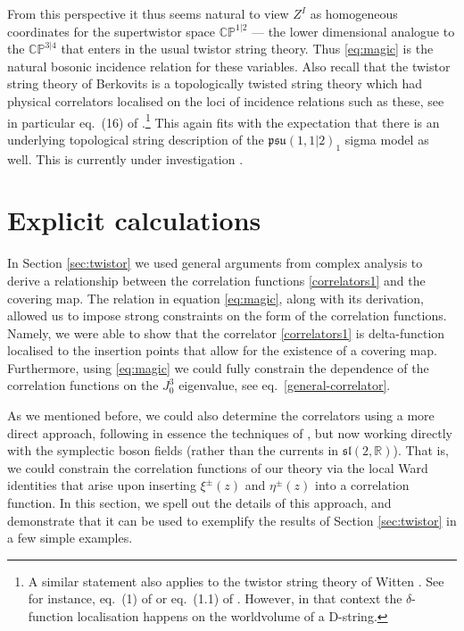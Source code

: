 \documentclass[a4paper,11pt]{article}
\numberwithin{equation}{section}
\begin{document}
{}From this perspective it thus seems natural to view $Z^I$ as homogeneous coordinates for the supertwistor space 
$\mathbb{CP}^{1|2}$ --- the lower dimensional analogue to the $\mathbb{CP}^{3|4}$ that enters in the usual twistor string theory. Thus \eqref{eq:magic} is the natural bosonic incidence relation for these variables. Also recall that the twistor string theory of Berkovits \cite{Berkovits:2004hg} is a topologically twisted string theory which had physical correlators localised on the loci of incidence relations such as these, see in particular eq.~(16) of \cite{Berkovits:2004hg}.\footnote{A similar statement also applies to the twistor string theory of Witten \cite{Witten:2003nn}. See for instance, eq.~(1) of \cite{Berkovits:2004hg} or eq.~(1.1) of \cite{Roiban:2004yf}. However, in that context the $\delta$-function localisation happens on the worldvolume of a D-string.} This again fits with the expectation that there is an underlying topological string description of the $\mathfrak{psu}(1,1|2)_1$ sigma model as well. This is currently under investigation \cite{GG}.







\section{Explicit calculations}\label{sec:examples}

In Section \ref{sec:twistor} we used general arguments from complex analysis to derive a relationship between the correlation functions \eqref{correlators1} and the covering map. The relation in equation \eqref{eq:magic}, along with its derivation, allowed us to impose strong constraints on the form of the correlation functions. Namely, we were able to show that the correlator \eqref{correlators1} is delta-function localised to the insertion points that allow for the existence of a covering map. Furthermore, using \eqref{eq:magic} we could fully constrain the dependence of the correlation functions on the $J^3_0$ eigenvalue, see eq.~\eqref{general-correlator}.

As we mentioned before, we could also determine the correlators using a more direct approach, following in essence the techniques of \cite{Eberhardt:2019ywk}, but now working directly with the symplectic boson fields (rather than the currents in $\mathfrak{sl}(2,\mathds{R})$). 
That is, we could constrain the correlation functions of our theory via the local Ward identities that arise upon inserting $\xi^{\pm}(z)$ and $\eta^{\pm}(z)$ into a correlation function. In this section, we spell out the details of this approach, and demonstrate that it can be used to exemplify the results of Section \ref{sec:twistor} in a few simple examples.
\end{document}
